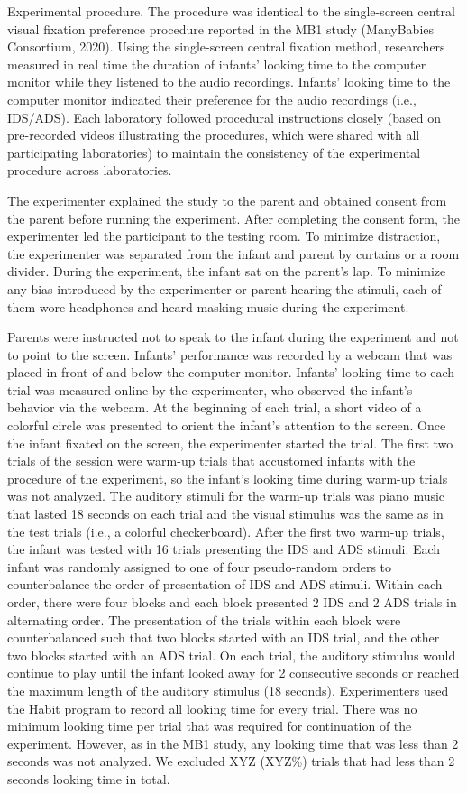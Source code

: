 \documentclass[
  ,man,floatsintext]{apa6}
\begin{document}
Experimental procedure. The procedure was identical to the single-screen central visual fixation preference procedure reported in the MB1 study (ManyBabies Consortium, 2020). Using the single-screen central fixation method, researchers measured in real time the duration of infants' looking time to the computer monitor while they listened to the audio recordings. Infants' looking time to the computer monitor indicated their preference for the audio recordings (i.e., IDS/ADS). Each laboratory followed procedural instructions closely (based on pre-recorded videos illustrating the procedures, which were shared with all participating laboratories) to maintain the consistency of the experimental procedure across laboratories.

The experimenter explained the study to the parent and obtained consent from the parent before running the experiment. After completing the consent form, the experimenter led the participant to the testing room. To minimize distraction, the experimenter was separated from the infant and parent by curtains or a room divider. During the experiment, the infant sat on the parent's lap. To minimize any bias introduced by the experimenter or parent hearing the stimuli, each of them wore headphones and heard masking music during the experiment.

Parents were instructed not to speak to the infant during the experiment and not to point to the screen. Infants' performance was recorded by a webcam that was placed in front of and below the computer monitor. Infants' looking time to each trial was measured online by the experimenter, who observed the infant's behavior via the webcam. At the beginning of each trial, a short video of a colorful circle was presented to orient the infant's attention to the screen. Once the infant fixated on the screen, the experimenter started the trial. The first two trials of the session were warm-up trials that accustomed infants with the procedure of the experiment, so the infant's looking time during warm-up trials was not analyzed. The auditory stimuli for the warm-up trials was piano music that lasted 18 seconds on each trial and the visual stimulus was the same as in the test trials (i.e., a colorful checkerboard). After the first two warm-up trials, the infant was tested with 16 trials presenting the IDS and ADS stimuli. Each infant was randomly assigned to one of four pseudo-random orders to counterbalance the order of presentation of IDS and ADS stimuli. Within each order, there were four blocks and each block presented 2 IDS and 2 ADS trials in alternating order. The presentation of the trials within each block were counterbalanced such that two blocks started with an IDS trial, and the other two blocks started with an ADS trial. On each trial, the auditory stimulus would continue to play until the infant looked away for 2 consecutive seconds or reached the maximum length of the auditory stimulus (18 seconds). Experimenters used the Habit program to record all looking time for every trial. There was no minimum looking time per trial that was required for continuation of the experiment. However, as in the MB1 study, any looking time that was less than 2 seconds was not analyzed. We excluded XYZ (XYZ\%) trials that had less than 2 seconds looking time in total.
\end{document}
